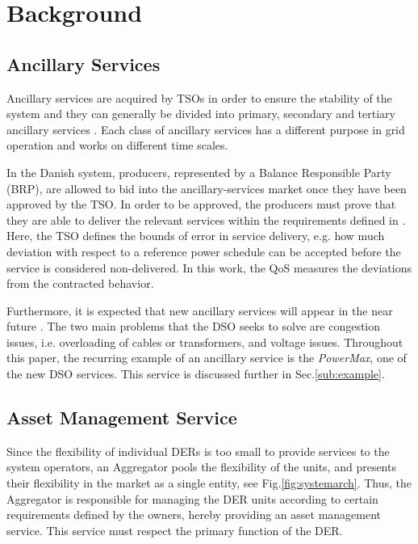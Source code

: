 \section{Background} \label{sec:method}

	\subsection{Ancillary Services} %
	\label{sub:ancillary}
	Ancillary services are acquired by TSOs in order to ensure the stability of the system and they can generally be divided into primary, secondary and tertiary ancillary services \cite{Rebours}. Each class of ancillary services has a different purpose in grid operation and works on different time scales.

	In the Danish system, producers, represented by a Balance Responsible Party (BRP), are allowed to bid into the ancillary-services market once they have been approved by the TSO. In order to be approved, the producers must prove that they are able to deliver the relevant services within the requirements defined in \cite{EnerginetAncillary,bondy2013}. Here, the TSO defines the bounds of error in service delivery, e.g. how much deviation with respect to a reference power schedule can be accepted before the service is considered non-delivered. In this work, the QoS measures the deviations from the contracted behavior.

	Furthermore, it is expected that new ancillary services will appear in the near future \cite{FLECH}. The two main problems that the DSO seeks to solve are congestion issues, i.e. overloading of cables or transformers, and voltage issues. Throughout this paper, the recurring example of an ancillary service is the \emph{PowerMax}, one of the new DSO services. This service is discussed further in Sec.\ref{sub:example}.
	
	\subsection{Asset Management Service} %
	\label{sub:asset}
	Since the flexibility of individual DERs is too small to provide services to the system operators, an Aggregator pools the flexibility of the units, and presents their flexibility in the market as a single entity, see Fig.\ref{fig:systemarch}. Thus, the Aggregator is responsible for managing the DER units according to certain requirements defined by the owners, hereby providing an asset management service. This service must respect the primary function of the DER. 
	
